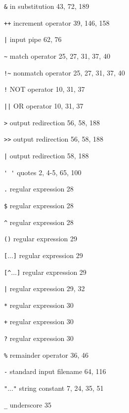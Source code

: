 \begin{multicols}{3}
\hangindent=4pc  \verb'&' in substitution 43, 72, 189

\hangindent=4pc  \verb'++' increment operator 39, 146, 158

\hangindent=4pc  \verb'|' input pipe 62, 76

\hangindent=4pc  \verb'~' match operator 25, 27, 31, 37, 40

\hangindent=4pc  \verb'!~' nonmatch operator 25, 27, 31, 37, 40

\hangindent=4pc  \verb'!' NOT operator 10, 31, 37

\hangindent=4pc  \verb'||' OR operator 10, 31, 37

\hangindent=4pc  \verb'>' output redirection 56, 58, 188

\hangindent=4pc  \verb'>>' output redirection 56, 58, 188

\hangindent=4pc  \verb'|' output redirection 58, 188

\hangindent=4pc  \verb"' '" quotes 2, 4-5, 65, 100

\hangindent=4pc  \verb'.' regular expression 28

\hangindent=4pc  \verb'$' regular expression 28

\hangindent=4pc  \verb'^' regular expression 28

\hangindent=4pc  \verb'()' regular expression 29

\hangindent=4pc  \verb'['...\verb']' regular expression 29

\hangindent=4pc  \verb'[^'...\verb']' regular expression 29

\hangindent=4pc  \verb'|' regular expression 29, 32

\hangindent=4pc  \verb'*' regular expression 30

\hangindent=4pc  \verb'+' regular expression 30

\hangindent=4pc  \verb'?' regular expression 30

\hangindent=4pc  \verb'%' remainder operator 36, 46

\hangindent=4pc  \verb'-' standard input filename 64, 116

\hangindent=4pc  \verb'"'...\verb'"' string constant 7, 24, 35, 51

\hangindent=4pc  \verb'_' underscore 35


\end{multicols}
